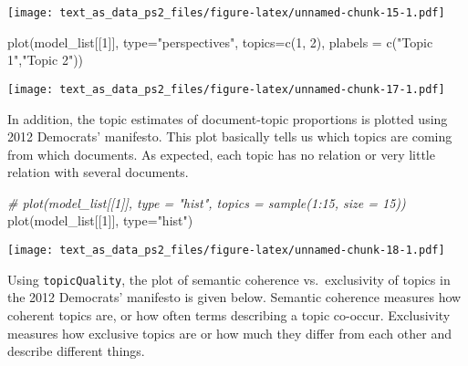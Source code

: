 \documentclass[
]{article}
\newenvironment{Shaded}{\begin{snugshade}}{\end{snugshade}}
\newcommand{\AttributeTok}[1]{\textcolor[rgb]{0.77,0.63,0.00}{#1}}
\newcommand{\CommentTok}[1]{\textcolor[rgb]{0.56,0.35,0.01}{\textit{#1}}}
\newcommand{\DecValTok}[1]{\textcolor[rgb]{0.00,0.00,0.81}{#1}}
\newcommand{\FunctionTok}[1]{\textcolor[rgb]{0.00,0.00,0.00}{#1}}
\newcommand{\NormalTok}[1]{#1}
\newcommand{\SpecialCharTok}[1]{\textcolor[rgb]{0.00,0.00,0.00}{#1}}
\newcommand{\StringTok}[1]{\textcolor[rgb]{0.31,0.60,0.02}{#1}}
\begin{document}
\texttt{[image: text\_as\_data\_ps2\_files/figure-latex/unnamed-chunk-15-1.pdf]}

\begin{Shaded}
\begin{Highlighting}[]
\FunctionTok{plot}\NormalTok{(model\_list[[}\DecValTok{1}\NormalTok{]], }
     \AttributeTok{type=}\StringTok{"perspectives"}\NormalTok{, }
     \AttributeTok{topics=}\FunctionTok{c}\NormalTok{(}\DecValTok{1}\NormalTok{, }\DecValTok{2}\NormalTok{), }
     \AttributeTok{plabels =} \FunctionTok{c}\NormalTok{(}\StringTok{"Topic 1"}\NormalTok{,}\StringTok{"Topic 2"}\NormalTok{))}
\end{Highlighting}
\end{Shaded}

\texttt{[image: text\_as\_data\_ps2\_files/figure-latex/unnamed-chunk-17-1.pdf]}

In addition, the topic estimates of document-topic proportions is
plotted using 2012 Democrats' manifesto. This plot basically tells us
which topics are coming from which documents. As expected, each topic
has no relation or very little relation with several documents.

\begin{Shaded}
\begin{Highlighting}[]
\CommentTok{\# plot(model\_list[[1]], type = "hist", topics = sample(1:15, size = 15))}
\FunctionTok{plot}\NormalTok{(model\_list[[}\DecValTok{1}\NormalTok{]], }\AttributeTok{type=}\StringTok{"hist"}\NormalTok{)}
\end{Highlighting}
\end{Shaded}

\texttt{[image: text\_as\_data\_ps2\_files/figure-latex/unnamed-chunk-18-1.pdf]}

Using \texttt{topicQuality}, the plot of semantic coherence
vs.~exclusivity of topics in the 2012 Democrats' manifesto is given
below. Semantic coherence measures how coherent topics are, or how often
terms describing a topic co-occur. Exclusivity measures how exclusive
topics are or how much they differ from each other and describe
different things.

\begin{Shaded}
\end{Shaded}
\end{document}
